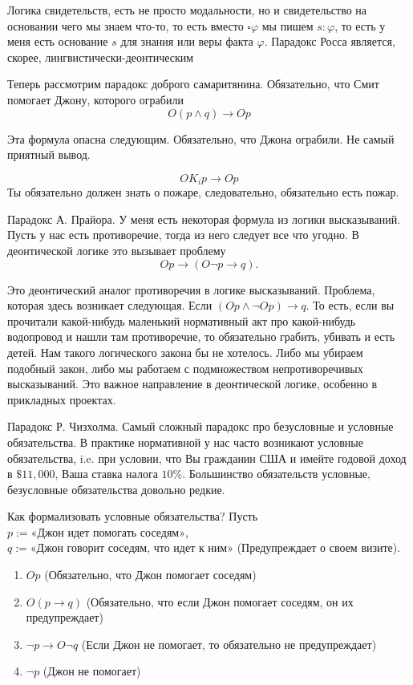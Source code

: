 \documentclass[openany]{book}
\theoremstyle{plain}
\theoremstyle{definition}
\begin{document}
Логика свидетельств, есть не просто модальности, но и свидетельство на основании чего мы знаем что-то, то есть вместо \(\square \varphi\) мы пишем \(s : \varphi\), то есть у меня есть основание \(s\) для знания или веры факта \(\varphi\). Парадокс Росса является, скорее, лингвистически-деонтическим



Теперь рассмотрим парадокс доброго самаритянина. Обязательно, что Смит помогает Джону, которого ограбили
\[O (p \land q) \to O p\]

Эта формула опасна следующим. Обязательно, что Джона ограбили. Не самый приятный вывод. 

\[O K_i p \to O p\]
Ты обязательно должен знать о пожаре, следовательно, обязательно есть пожар.

Парадокс А. Прайора. У меня есть некоторая формула из логики высказываний. Пусть у нас есть противоречие, тогда из него следует все что угодно. В деонтической логике это вызывает проблему \[O p \to (O \neg p \to q).\]

Это деонтический аналог противоречия в логике высказываний. Проблема, которая здесь возникает следующая. Если \((O p \land \neg O p) \to q\). То есть, если вы прочитали какой-нибудь маленький нормативный акт про какой-нибудь водопровод и нашли там противоречие, то обязательно грабить, убивать и есть детей. Нам такого логического закона бы не хотелось. Либо мы убираем подобный закон, либо мы работаем с подмножеством непротиворечивых высказываний. Это важное направление в деонтической логике, особенно в прикладных проектах.

Парадокс Р. Чизхолма. Самый сложный парадокс про безусловные и условные обязательства. В практике нормативной у нас часто возникают условные обязательства, i.e. при условии, что Вы гражданин США и имейте годовой доход в \(\$11,000\), Ваша ставка налога \(10\%\). Большинство обязательств условные, безусловные обязательства довольно редкие. 

Как формализовать условные обязательства? Пусть \(p := \text{«Джон идет помогать соседям»}\), \(q := \text{«Джон говорит соседям, что идет к ним»}\) (Предупреждает о своем визите).

\begin{enumerate}
    \item \(O p\) (Обязательно, что Джон помогает соседям)
    \item \(O (p \to q)\) (Обязательно, что если Джон помогает соседям, он их предупреждает)
    \item \(\neg p \to O \neg q\) (Если Джон не помогает, то обязательно не предупреждает)
    \item \(\neg p\) (Джон не помогает)
\end{enumerate}
\end{document}
